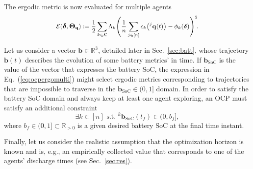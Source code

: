 \documentclass[letterpaper,10pt,conference,twoside]{IEEEtran}
\theoremstyle{definition}
\begin{document}
The ergodic metric is now evaluated for multiple agents\vspace*{-.1cm}
\begin{equation}\label{eq:multiergometric}
  \mathcal{E}(\boldsymbol{\delta},\boldsymbol{\Theta}_{\mathbf{q}}):={\small
  \frac{1}{2}
  \sum_{k\in\mathcal{K}}\Lambda_k 
    \Bigg(
      \frac{1}{n}\sum_{j\in[n]} c_k\big({}^j\mathbf{q}(t)\big)-\phi_k(\boldsymbol{\delta})
    \Bigg)^2\hspace*{-.5ex}.}
\end{equation}
\vspace*{-.2cm}

Let us consider a vector $\mathbf{b}\in\mathbb{R}^3$, detailed later in Sec.~\ref{sec:batt}, whose trajectory $\mathbf{b}(t)$ describes the evolution of some battery metrics' in time. If $\mathbf{b}_{\text{SoC}}$ is the value of the vector that expresses the battery %
SoC, the expression in Eq.~(\ref{eq:ocpergomulti}) might select ergodic metrics corresponding to trajectories that are impossible to traverse in the $\mathbf{b}_{\text{SoC}}\in(0,1]$ domain. %
%
In order to satisfy the battery SoC domain and always keep at least one agent exploring, an OCP must satisfy an additional constraint
\begin{equation}\label{eq:ocpbattconst}
  \exists k\in[n]\text{ s.t. }{}^k\mathbf{b}_{\text{SoC}}(t_f)\in(0,b_f],
\end{equation}
where $b_f\in(0,1]\subset\mathbb{R}_{>0}$ is a given desired battery SoC at the final time instant.

Finally, let us consider the realistic assumption that the optimization horizon %
is known and is,
e.g., an empirically collected value that corresponds to one of the agents' discharge times (see Sec.~\ref{sec:res}).
\end{document}
